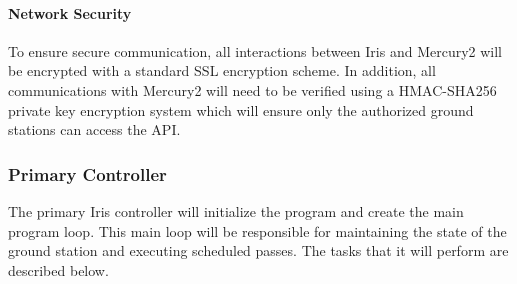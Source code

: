 \documentclass{mxl-note}
\begin{document}
\paragraph{Network Security}
To ensure secure communication, all interactions between Iris and Mercury2 will be encrypted with a standard SSL encryption scheme. In addition, all communications with Mercury2 will need to be verified using a HMAC-SHA256 private key encryption system which will ensure only the authorized ground stations can access the API.

\subsubsection{Primary Controller}
The primary Iris controller will initialize the program and create the main program loop. This main loop will be responsible for maintaining the state of the ground station and executing scheduled passes. The tasks that it will perform are described below.
\end{document}
